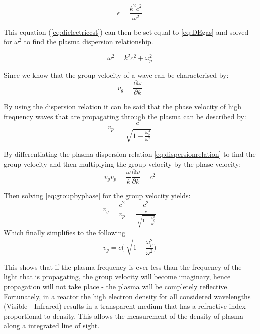 \documentclass[12pt,a4paper,oneside]{report}
\begin{document}
\begin{equation}
\epsilon = \frac{k^{2}c^{2}}{\omega ^{2}}
	\label{eq:dielectriccst}
\end{equation}

This equation (\ref{eq:dielectriccst}) can then be set equal to \ref{eq:DEgas} and solved for $\omega ^{2}$ to find the plasma dispersion relationship.

\begin{equation}
\omega ^{2} = k^{2}c^{2} + \omega _{p}^{2}
	\label{eq:dispersionrelation}
\end{equation}

Since we know that the group velocity of a wave can be characterised by:
\begin{equation}
v_{g} = \frac{\partial \omega}{\partial k}
	\label{eq:groupvelocity}
\end{equation}

By using the dispersion relation it can be said that the phase velocity of high frequency waves that are propagating through the plasma can be described by:
\begin{equation}
v_{p} = \frac{c}{\sqrt[]{1-\frac{\omega _{p}^{2}}{\omega ^{2}}}}
	\label{eq:highfreqprop}
\end{equation}

By differentiating the plasma dispersion relation \ref{eq:dispersionrelation} to find the group velocity and then multiplying the group velocity by the phase velocity:
\begin{equation}
v_{g} v_{p} = \frac{\omega}{k} \frac{\partial \omega}{\partial k} = c^{2}
	\label{eq:groupbyphase}
\end{equation}

Then solving \ref{eq:groupbyphase} for the group velocity yields:
\begin{equation}
v_{g} = \frac{c^{2}}{v_{p}} = \frac{c^{2}}{\frac{c}{\sqrt[]{1-\frac{\omega _{p}^{2}}{\omega ^{2}}}}}
	\label{eq:groupvelocityplasma}
\end{equation}
Which finally simplifies to the following
\begin{equation}
v_{g} = c \Big(\sqrt[]{1-\frac{\omega _{p}^{2}}{\omega ^{2}}} \Big)
	\label{eq:groupvelocityplasma}
\end{equation}

This shows that if the plasma frequency is ever less than the frequency of the light that is propagating, the group velocity will become imaginary, hence propagation will not take place - the plasma will be completely reflective. Fortunately, in a reactor the high electron density for all considered wavelengths (Visible - Infrared) results in a transparent medium that has a refractive index proportional to density. This allows the measurement of the density of plasma along a integrated line of sight.\\
\end{document}
